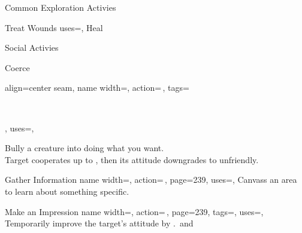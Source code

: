 \begin{PageFront}
\begin{Tables}{\frontTableHeight}
\begin{Table}{Common Exploration Activies}
\begin{entry}{Treat Wounds}
{                uses=\Medicine,
            }
                Heal  \hfill
                 \hfill
                \\\hfill
                \Ts\DC[15] \quad
                \E\DC[20] \quad
                \M\DC[30]  \quad
                \Le\DC[40] \hfill
            \end{entry}
        \end{Table}
        \TableSpace
        \begin{Table}{Social Activies}
            \begin{entry}{Coerce}{%
                align=center seam,
                name width=\activityLength,%
                action=\,,
                tags=\parbox{0.5\linewidth}{\raggedleft{}\,\Concentrate\\\Auditory\Linguistic},
                uses=\InitimidationWill,
            }
                Bully a creature into doing what you want.\\
                Target cooperates up to , then its attitude downgrades to unfriendly. \hfill
                \\
                \hfill
            \end{entry}
            \begin{entry}{Gather Information}{%
                name width=\activityLength,%
                action=\,,
                page=239,
                uses={\Diplomacy[tags={S}]},
            }
                Canvass an area to learn about something specific.\hfill
            \end{entry}
            \begin{entry}{Make an Impression}{%
                name width=\activityLength,%
                action=\,,
                page=239,
                tags=\kern-0.5pt\Mental\Concentrate,
                uses=\DiplomacyWill,
            }
                Temporarily improve the target's attitude by .
                \quad\Auditory\,and \Linguistic

\end{entry}
\end{Table}
\end{Tables}
\end{PageFront}
